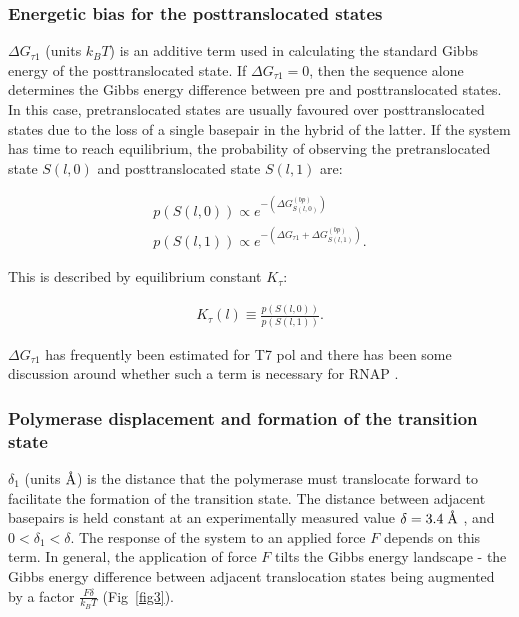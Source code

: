\documentclass[10pt,letterpaper]{article}
\newcommand{\angstrom}{\mbox{\normalfont\AA}}
\begin{document}
\subsubsection*{Energetic bias for the posttranslocated states}
$\Delta G_{\tau 1}$ (units $k_BT$) is an additive term used in calculating the standard Gibbs energy of the posttranslocated state. If $\Delta G_{\tau 1} = 0$, then the sequence alone determines the Gibbs energy difference between pre and posttranslocated states. In this case, pretranslocated states are usually favoured over posttranslocated states due to the loss of a single basepair in the hybrid of the latter. If the system has time to reach equilibrium, the probability of observing the pretranslocated state $S(l,0)$ and posttranslocated state $S(l,1)$ are:


\begin{eqnarray}
\label{eq:DGpost}
p(S(l,0)) \propto e^{-(\Delta G^{(bp)}_{S(l,0)})} \\
p(S(l,1)) \propto e^{-(\Delta G_{\tau 1} + \Delta G^{(bp)}_{S(l,1)})}.
\end{eqnarray}



This is described by equilibrium constant $K_\tau$:

\begin{eqnarray}
\label{eq:DGpostEquilibrium}
K_\tau(l) \equiv \frac{p(S(l,0))}{p(S(l,1))}.
\end{eqnarray}



$\Delta G_{\tau 1}$ has frequently been estimated for T7 pol \cite{yin2004structural, yu2012small, Dangkulwanich2013complete} and there has been some discussion around whether such a term is necessary for RNAP \cite{bai2007mechanochemical}. \\

\subsubsection*{Polymerase displacement and formation of the transition state}
$\delta_1$ (units $\angstrom$) is the distance that the polymerase must translocate forward to facilitate the formation of the transition state. The distance between adjacent basepairs is held constant at an experimentally measured value $\delta = 3.4\; \angstrom$ \cite{watson1953molecular}, and   $0 <\delta_1 < \delta$. The response of the system to an applied force $F$ depends on this term. In general, the application of force $F$ tilts the Gibbs energy landscape - the Gibbs energy difference between adjacent translocation states being augmented by a factor $\frac{F\delta}{k_BT}$ (Fig~\ref{fig3}\cite{depken2009origin, herbert2008single}).
\end{document}
